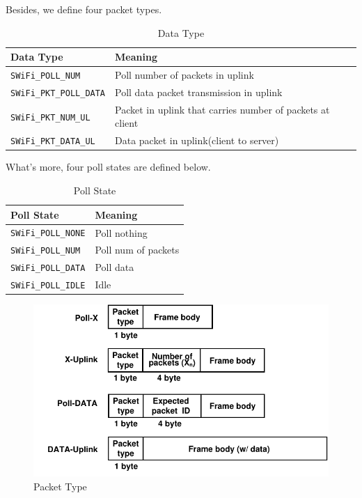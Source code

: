 \documentclass{article}
\begin{document}
Besides, we define four packet types. 
\begin{table}[h!]
   \centering
   \caption{Data Type}
   \label{tab:table3}
   \begin{tabular}{| l | l |}
      \hline
      Data Type  &  Meaning\\ \hline
      \lstinline |SWiFi_POLL_NUM| & Poll number of packets in uplink\\ \hline 
      \lstinline |SWiFi_PKT_POLL_DATA|  & Poll data packet transmission in uplink\\ \hline 
      \lstinline |SWiFi_PKT_NUM_UL| & Packet in uplink that carries number of packets at client\\ \hline 
      \lstinline |SWiFi_PKT_DATA_UL| & Data packet in uplink(client to server)\\  
     \hline
   \end{tabular}
\end{table}
 
  
What's more, four poll states are defined below. 
\begin{table}[h!]
   \centering
   \caption{Poll State}
   \label{tab:table4}
   \begin{tabular}{| l | l |}
      \hline
      Poll State  &  Meaning\\ \hline
      \lstinline |SWiFi_POLL_NONE| & Poll nothing\\ \hline 
      \lstinline |SWiFi_POLL_NUM|  & Poll num of packets\\ \hline 
      \lstinline |SWiFi_POLL_DATA| & Poll data\\ \hline 
      \lstinline |SWiFi_POLL_IDLE| & Idle\\  
     \hline
   \end{tabular}
\end{table}
     
\begin{figure}[htbp]
\centering
\includegraphics[scale=0.6]{header.pdf}
\caption{Packet Type}
\label{header}
\end{figure}
\end{document}
